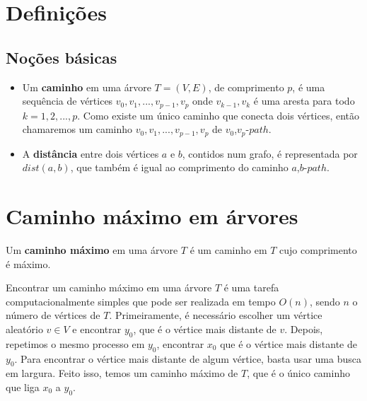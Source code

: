 \documentclass[a4paper,12pt]{article}
\begin{document}
\newpage


\section{Definições}

	\subsection{Noções básicas}
		\begin{itemize}
			\item Um \textbf{caminho} em uma árvore $T=(V,E)$, de 
	    	comprimento $p$, é uma sequência de vértices 
	    	$v_0, v_1, ...,v_{p-1}, v_p$ 
	    	onde {$v_{k-1}, v_k$} é uma aresta para todo 
	    	$k = 1,2,..., p$. 
	    	Como existe um único caminho que conecta dois vértices,
	    	então chamaremos um caminho 
	    	$v_0, v_1, ...,v_{p-1}, v_p$ de
	    	$v_0$,$v_p$-$path$.

			\item A \textbf{distância} entre dois vértices $a$ e 
			$b$, contidos num grafo, é representada por 
			$dist(a,b)$, que também é igual ao comprimento do
			caminho $a$,$b$-$path$.

		\end{itemize}



\section{Caminho máximo em árvores}

	Um \textbf{caminho máximo} em uma árvore $T$ é um caminho em 
	$T$ cujo comprimento é máximo.

	Encontrar um caminho máximo em uma árvore $T$ é uma tarefa
	computacionalmente simples que pode ser realizada em tempo 
	$O(n)$, sendo $n$ o número de vértices de $T$. 
	Primeiramente, é necessário escolher um vértice aleatório 
	$v \in V$ e encontrar $y_0$, que é o vértice mais distante de 
	$v$.
	Depois, repetimos o mesmo processo em $y_0$, encontrar
	$x_0$ que é o vértice mais distante de $y_0$. 
	Para encontrar o vértice mais distante de algum vértice, basta 
	usar uma busca em largura.  
	Feito isso, temos um caminho máximo de $T$, que é o único
	caminho que liga $x_0$ a $y_0$.
\end{document}
